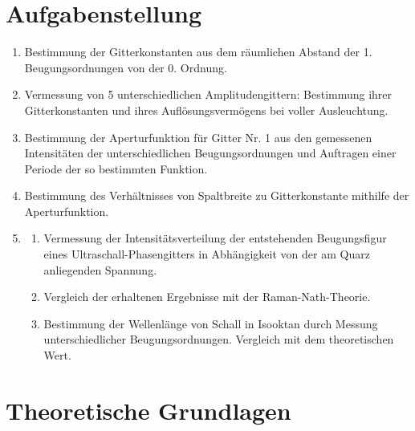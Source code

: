 \section{Aufgabenstellung}
\begin{enumerate}
\item Bestimmung der Gitterkonstanten aus dem räumlichen Abstand der 1. Beugungsordnungen von der 0. Ordnung.\\
\item Vermessung von 5 unterschiedlichen Amplitudengittern: Bestimmung ihrer Gitterkonstanten und ihres Auflösungsvermögens bei voller Ausleuchtung.\\
\item Bestimmung der Aperturfunktion für Gitter Nr. 1 aus den gemessenen Intensitäten der unterschiedlichen Beugungsordnungen und Auftragen einer Periode der so bestimmten Funktion.\\
\item Bestimmung des Verhältnisses von Spaltbreite zu Gitterkonstante mithilfe der Aperturfunktion.\\
\item
\begin{enumerate}
\item Vermessung der Intensitätsverteilung der entstehenden Beugungsfigur eines Ultraschall-Phasengitters in Abhängigkeit von der am Quarz anliegenden Spannung.\\
\item Vergleich der erhaltenen Ergebnisse mit der Raman-Nath-Theorie.
\item Bestimmung der Wellenlänge von Schall in Isooktan durch Messung unterschiedlicher Beugungsordnungen. Vergleich mit dem theoretischen Wert.
\end{enumerate}
\end{enumerate}
\clearpage
\section{Theoretische Grundlagen}
